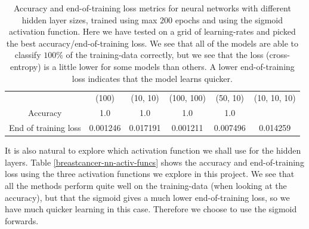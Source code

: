 \documentclass{article}
\begin{document}
\begin{table}
      \centering
      \begin{tabular}{| c | c | c | c | c | c |}
                                 & (100)    & (10, 10) & (100, 100) & (50, 10) & (10, 10, 10) \\
            Accuracy             & 1.0      & 1.0      & 1.0        & 1.0                     \\
            End of training loss & 0.001246 & 0.017191 & 0.001211   & 0.007496 & 0.014259     \\
      \end{tabular}
      \caption{Accuracy and end-of-training loss metrics for neural networks
            with different hidden layer sizes, trained using max $200$ epochs and
            using the sigmoid activation function. Here we have tested on a grid of
            learning-rates and picked the best accuracy/end-of-training loss. We see
            that all of the models are able to classify $100\%$ of the training-data
            correctly, but we see that the loss (cross-entropy) is a little lower for
            some models than others. A lower end-of-training loss indicates that the
            model learns quicker.}
      \label{breastcancer-nn-hidden-layers}
\end{table}

It is also natural to explore which activation function we shall use for the
hidden layers. Table \ref{breastcancer-nn-activ-funcs} shows the accuracy and
end-of-training loss using the three activation functions we explore in this
project. We see that all the methods perform quite well on the training-data
(when looking at the accuracy), but that the sigmoid gives a much lower
end-of-training loss, so we have much quicker learning in this case. Therefore
we choose to use the sigmoid forwards.
\end{document}
